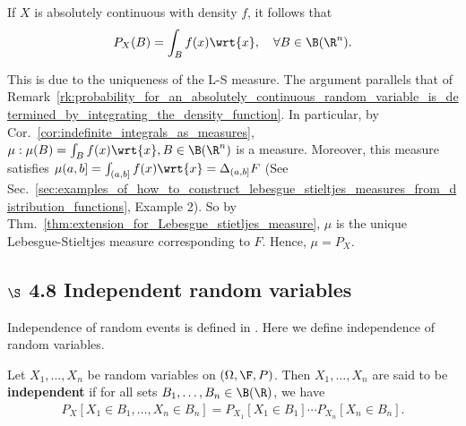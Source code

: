 \documentclass{article} %
\begin{document}
\begin{remark}
If $X$ is absolutely continuous with density $f$, it follows that
\begin{align}
P_X(B) = \int_B f(x) \wrt{x}, \quad \forall B \in \B(\R^n).
\label{eqn:probability_for_an_absolutely_continuous_rv_is_determined_by_integrating_the_density_function}	
\end{align}

This is due to the uniqueness of the L-S measure. The argument parallels that of Remark~\ref{rk:probability_for_an_absolutely_continuous_random_variable_is_determined_by_integrating_the_density_function}.	 In particular, by Cor.~\ref{cor:indefinite_integrals_as_measures}, $\mu : \mu(B) = \int_B f(x) \wrt{x}, B \in \B(\R^n)$ is a measure.  Moreover, this measure satisfies $\mu(a,b] = \int_{(a,b]} f(x) \wrt{x} = \Delta_{(a,b]} F$ (See Sec.~\ref{sec:examples_of_how_to_construct_lebesgue_stieltjes_measures_from_distribution_functions}, Example 2).  So by Thm.~\ref{thm:extension_for_Lebesgue_stietljes_measure},  $\mu$ is the unique Lebesgue-Stieltjes measure corresponding to $F$. Hence, $\mu=P_X$.
\label{rk:probability_for_an_absolutely_continuous_random_vector_is_determined_by_integrating_the_density_function}	
\end{remark}



\subsection{$\S$ 4.8 Independent random variables}

Independence of random events is defined in \cite[Sec.~4.3]{ash2000probability}.   Here we define independence of random variables.

\begin{definition}
Let $X_1,\hdots, X_n$ be random variables on $(\Omega, \F, P)$.  Then $X_1,\hdots, X_n$ are said to be \textbf{independent} if for all sets $B_1, \hdots, B_n \in \B(\R)$, we have 
\begin{align}
P_X[X_1 \in B_1, \hdots, X_n \in B_n] = P_{X_1}[X_1 \in B_1] \cdots P_{X_n}[X_n \in B_n].	
\label{eqn:independence_of_random_variables}	
\end{align}

\label{def:independence_of_random_variables}
\end{definition}
\end{document}
